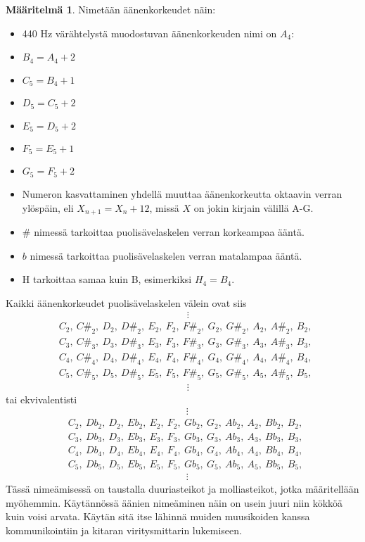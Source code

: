 \documentclass[12pt]{article}
\theoremstyle{plain}
\theoremstyle{definition}
\newtheorem{definition}[theorem]{M\"a\"aritelm\"a}
\newcounter{audiocounter}
\newcommand{\audio}[1]{
    \stepcounter{audiocounter}
    
}
\begin{document}
\begin{definition}
Nimetään äänenkorkeudet näin:
\begin{itemize} \itemsep 0em
\item 440 Hz värähtelystä muodostuvan äänenkorkeuden nimi on $A_4$: \audio{A4}
\item $B_4 = A_4 + 2$
\item $C_5 = B_4 + 1$
\item $D_5 = C_5 + 2$
\item $E_5 = D_5 + 2$
\item $F_5 = E_5 + 1$
\item $G_5 = F_5 + 2$
\item Numeron kasvattaminen yhdellä muuttaa äänenkorkeutta oktaavin verran ylöspäin, eli $X_{n+1}=X_n+12$, missä $X$ on jokin kirjain välillä A-G.
\item $\#$ nimessä tarkoittaa puolisävelaskelen verran korkeampaa ääntä.
\item $b$ nimessä tarkoittaa puolisävelaskelen verran matalampaa ääntä.
\item H tarkoittaa samaa kuin B, esimerkiksi $H_4 = B_4$.
\end{itemize}
\end{definition}

Kaikki äänenkorkeudet puolisävelaskelen välein ovat siis
\begin{align*}
&\quad\qquad\qquad\qquad\qquad\qquad\qquad\vdots \\
&C_2,~C\#_2,~D_2,~D\#_2,~E_2,~F_2,~F\#_2,~G_2,~G\#_2,~A_2,~A\#_2,~B_2,~\\
&C_3,~C\#_3,~D_3,~D\#_3,~E_3,~F_3,~F\#_3,~G_3,~G\#_3,~A_3,~A\#_3,~B_3,~\\
&C_4,~C\#_4,~D_4,~D\#_4,~E_4,~F_4,~F\#_4,~G_4,~G\#_4,~A_4,~A\#_4,~B_4,~\\
&C_5,~C\#_5,~D_5,~D\#_5,~E_5,~F_5,~F\#_5,~G_5,~G\#_5,~A_5,~A\#_5,~B_5,~\\
&\quad\qquad\qquad\qquad\qquad\qquad\qquad\vdots
\end{align*}
tai ekvivalentisti
\begin{align*}
&\qquad\qquad\qquad\qquad\qquad\qquad\vdots \\
&C_2,~Db_2,~D_2,~Eb_2,~E_2,~F_2,~Gb_2,~G_2,~Ab_2,~A_2,~Bb_2,~B_2,~\\
&C_3,~Db_3,~D_3,~Eb_3,~E_3,~F_3,~Gb_3,~G_3,~Ab_3,~A_3,~Bb_3,~B_3,~\\
&C_4,~Db_4,~D_4,~Eb_4,~E_4,~F_4,~Gb_4,~G_4,~Ab_4,~A_4,~Bb_4,~B_4,~\\
&C_5,~Db_5,~D_5,~Eb_5,~E_5,~F_5,~Gb_5,~G_5,~Ab_5,~A_5,~Bb_5,~B_5,~\\
&\qquad\qquad\qquad\qquad\qquad\qquad\vdots
\end{align*}
Tässä nimeämisessä on taustalla duuriasteikot ja molliasteikot, jotka määritellään myöhemmin.
Käytännössä äänien nimeäminen näin on usein juuri niin kökköä kuin voisi arvata.
Käytän sitä itse lähinnä muiden muusikoiden kanssa kommunikointiin ja kitaran viritysmittarin lukemiseen.
\end{document}
